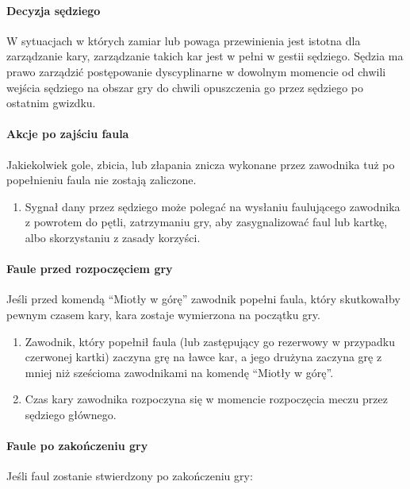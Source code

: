 \documentclass[12pt]{article}
\begin{document}
\paragraph{Decyzja sędziego}
W sytuacjach w których zamiar lub
powaga przewinienia jest istotna dla zarządzanie kary, zarządzanie
takich kar jest w pełni w gestii sędziego. Sędzia ma prawo zarządzić
postępowanie dyscyplinarne w dowolnym momencie od chwili wejścia
sędziego na obszar gry do chwili opuszczenia go przez sędziego po
ostatnim gwizdku.

\paragraph{Akcje po zajściu faula}
Jakiekolwiek gole, zbicia,
lub złapania znicza wykonane przez zawodnika tuż po popełnieniu faula
nie zostają zaliczone.

\begin{enumerate}
	\item
	      Sygnał dany przez sędziego może polegać na wysłaniu faulującego
	      zawodnika z powrotem do pętli, zatrzymaniu gry, aby zasygnalizować
	      faul lub kartkę, albo skorzystaniu z zasady korzyści.
\end{enumerate}

\paragraph{Faule przed rozpoczęciem gry}
Jeśli przed komendą
``Miotły w górę'' zawodnik popełni faula, który skutkowałby pewnym
czasem kary, kara zostaje wymierzona na początku gry.

\begin{enumerate}
	\item Zawodnik, który popełnił faula (lub zastępujący go rezerwowy w
	      przypadku czerwonej kartki) zaczyna grę na ławce kar, a jego drużyna
	      zaczyna grę z mniej niż sześcioma zawodnikami na komendę ``Miotły w
	      górę''.

	\item Czas kary zawodnika rozpoczyna się w momencie rozpoczęcia meczu przez
	      sędziego głównego.
\end{enumerate}

\paragraph{Faule po zakończeniu gry}
Jeśli faul zostanie
stwierdzony po zakończeniu gry:
\end{document}
